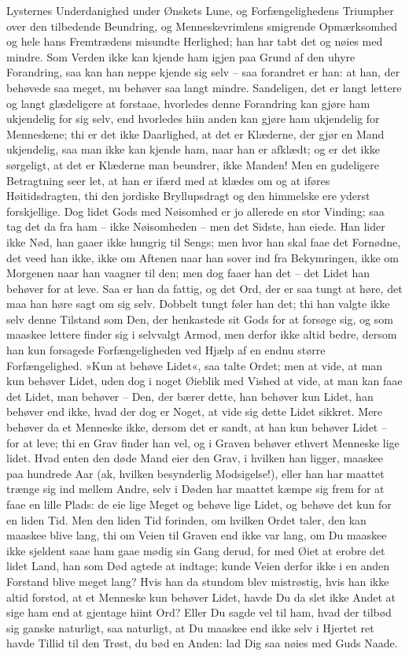 \documentclass[12pt,a4paper]{article}
\begin{document}
Lysternes Underdanighed under Ønskets Lune, og Forfængelighedens Triumpher over den tilbedende Beundring, og Menneskevrimlens smigrende Opmærksomhed og hele hans Fremtrædens misundte Herlighed; han har tabt det og nøies med mindre. Som Verden ikke kan kjende ham igjen paa Grund af den uhyre Forandring, saa kan han neppe kjende sig selv – saa forandret er han: at han, der behøvede saa meget, nu behøver saa langt mindre. Sandeligen, det er langt lettere og langt glædeligere at forstaae, hvorledes denne Forandring kan gjøre ham ukjendelig for sig selv, end hvorledes hiin anden kan gjøre ham ukjendelig for Menneskene; thi er det ikke Daarlighed, at det er Klæderne, der gjør en Mand ukjendelig, saa man ikke kan kjende ham, naar han er afklædt; og er det ikke sørgeligt, at det er Klæderne man beundrer, ikke Manden! Men en gudeligere Betragtning seer let, at han er ifærd med at klædes om og at iføres Høitidsdragten, thi den jordiske Bryllupsdragt og den himmelske ere yderst forskjellige. Dog lidet Gods med Nøisomhed er jo allerede en stor Vinding; saa tag det da fra ham – ikke Nøisomheden – men det Sidste, han eiede. Han lider ikke Nød, han gaaer ikke hungrig til Sengs; men hvor han skal faae det Fornødne, det veed han ikke, ikke om Aftenen naar han sover ind fra Bekymringen, ikke om Morgenen naar han vaagner til den; men dog faaer han det – det Lidet han behøver for at leve. Saa er han da fattig, og det Ord, der er saa tungt at høre, det maa han høre sagt om sig selv. Dobbelt tungt føler han det; thi han valgte ikke selv denne Tilstand som Den, der henkastede sit Gods for at forsøge sig, og som maaskee lettere finder sig i selvvalgt Armod, men derfor ikke altid bedre, dersom han kun forsagede Forfængeligheden ved Hjælp af en endnu større Forfængelighed. »Kun at behøve Lidet«, saa talte Ordet; men at vide, at man kun behøver Lidet, uden dog i noget Øieblik med Vished at vide, at man kan faae det Lidet, man behøver – Den, der bærer dette, han behøver kun Lidet, han behøver end ikke, hvad der dog er Noget, at vide sig dette Lidet sikkret. Mere behøver da et Menneske ikke, dersom det er sandt, at han kun behøver Lidet – for at leve; thi en Grav finder han vel, og i Graven behøver ethvert Menneske lige lidet. Hvad enten den døde Mand eier den Grav, i hvilken han ligger, maaskee paa hundrede Aar (ak, hvilken besynderlig Modsigelse!), eller han har maattet trænge sig ind mellem Andre, selv i Døden har maattet kæmpe sig frem for at faae en lille Plads: de eie lige Meget og behøve lige Lidet, og behøve det kun for en liden Tid. Men den liden Tid forinden, om hvilken Ordet taler, den kan maaskee blive lang, thi om Veien til Graven end ikke var lang, om Du maaskee ikke sjeldent saae ham gaae mødig sin Gang derud, for med Øiet at erobre det lidet Land, han som Død agtede at indtage; kunde Veien derfor ikke i en anden Forstand blive meget lang? Hvis han da stundom blev mistrøstig, hvis han ikke altid forstod, at et Menneske kun behøver Lidet, havde Du da slet ikke Andet at sige ham end at gjentage hiint Ord? Eller Du sagde vel til ham, hvad der tilbød sig ganske naturligt, saa naturligt, at Du maaskee end ikke selv i Hjertet ret havde Tillid til den Trøst, du bød en Anden: lad Dig saa nøies med Guds Naade.
\end{document}
